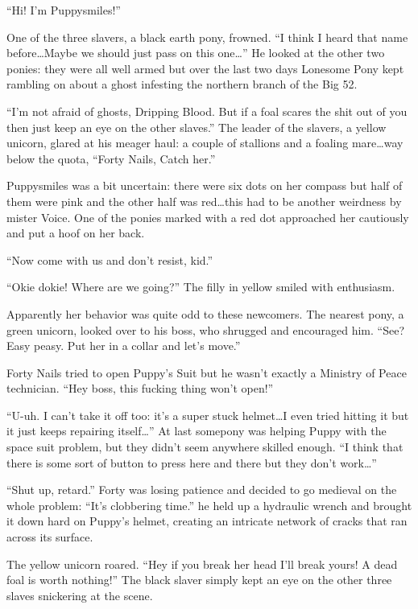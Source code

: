
``Hi! I'm Puppysmiles!''

One of the three slavers, a black earth pony, frowned. ``I think I heard that name before\dots Maybe we should just pass on this one\dots'' He looked at the other two ponies: they were all well armed but over the last two days Lonesome Pony kept rambling on about a ghost infesting the northern branch of the Big 52.

``I'm not afraid of ghosts, Dripping Blood. But if a foal scares the shit out of you then just keep an eye on the other slaves.'' The leader of the slavers, a yellow unicorn, glared at his meager haul: a couple of stallions and a foaling mare\dots way below the quota, ``Forty Nails, Catch her.''

Puppysmiles was a bit uncertain: there were six dots on her compass but half of them were pink and the other half was red\dots this had to be another weirdness by mister Voice. One of the ponies marked with a red dot approached her cautiously and put a hoof on her back.

``Now come with us and don't resist, kid.''

``Okie dokie! Where are we going?'' The filly in yellow smiled with enthusiasm.

Apparently her behavior was quite odd to these newcomers. The nearest pony, a green unicorn, looked over to his boss, who shrugged and encouraged him. ``See? Easy peasy. Put her in a collar and let's move.''

Forty Nails tried to open Puppy's Suit but he wasn't exactly a Ministry of Peace technician. ``Hey boss, this fucking thing won't open!''

``U-uh. I can't take it off too: it's a super stuck helmet\dots I even tried hitting it but it just keeps repairing itself\dots'' At last somepony was helping Puppy with the space suit problem, but they didn't seem anywhere skilled enough. ``I think that there is some sort of button to press here and there but they don't work\dots''

``Shut up, retard.'' Forty was losing patience and decided to go medieval on the whole problem: ``It's clobbering time.'' he held up a hydraulic wrench and brought it down hard on Puppy's helmet, creating an intricate network of cracks that ran across its surface.

The yellow unicorn roared. ``Hey if you break her head I'll break yours! A dead foal is worth nothing!'' The black slaver simply kept an eye on the other three slaves snickering at the scene.

